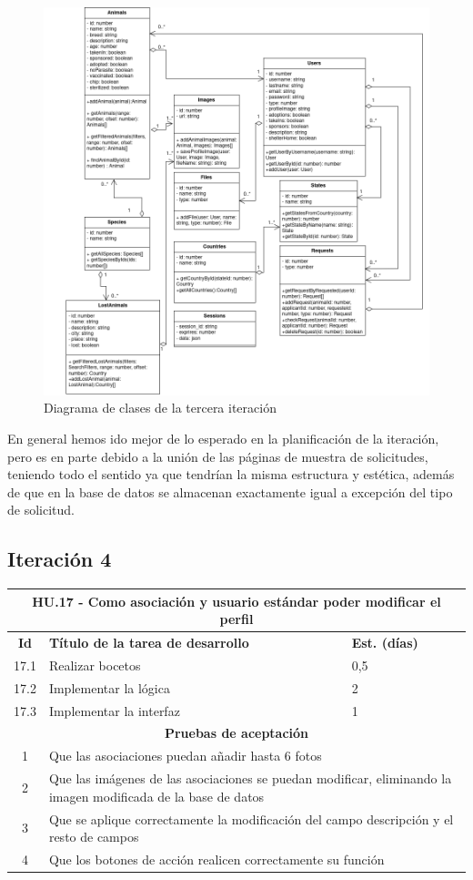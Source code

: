 \begin{figure}[H]
	\centering
	\includegraphics[width=0.7\linewidth]{"sprint 3/clases"}
	\caption{Diagrama de clases de la tercera iteración}
	\label{fig:clases3}
\end{figure}


En general hemos ido mejor de lo esperado en la planificación de la iteración, pero es en parte debido a la unión de las páginas de muestra de solicitudes, teniendo todo el sentido ya que tendrían la misma estructura y estética, además de que en la base de datos se almacenan exactamente igual a excepción del tipo de solicitud. 

\subsection{Iteración 4}


\begin{tabular}{|c|p{9.5cm}|p{1cm}|}
	\hline
	\multicolumn{3}{|p{10.5cm}|}{\textbf{HU.17 - Como asociación y usuario estándar poder modificar el perfil}} \\
	\hline
	\textbf{Id} & \textbf{Título de la tarea de desarrollo} & \textbf{Est. (días)} \\
	\hline
	17.1 & Realizar bocetos & 0,5 \\ \hline
	17.2 &  Implementar la lógica & 2 \\ \hline
	17.3 &  Implementar la interfaz & 1 \\ \hline
	\multicolumn{3}{|c|}{\textbf{Pruebas de aceptación}} \\ \hline
	1 & \multicolumn{2}{|p{12cm}|}{Que las asociaciones puedan añadir hasta 6 fotos} \\ \hline
	2 & \multicolumn{2}{|p{12cm}|}{Que las imágenes de las asociaciones se puedan modificar, eliminando la imagen modificada de la base de datos} \\ \hline
	3 & \multicolumn{2}{|p{12cm}|}{Que se aplique correctamente la modificación del campo descripción y el resto de campos} \\ \hline
	4 & \multicolumn{2}{|p{12cm}|}{Que los botones de acción realicen correctamente su función} \\ \hline
	
\end{tabular} \\ \\

